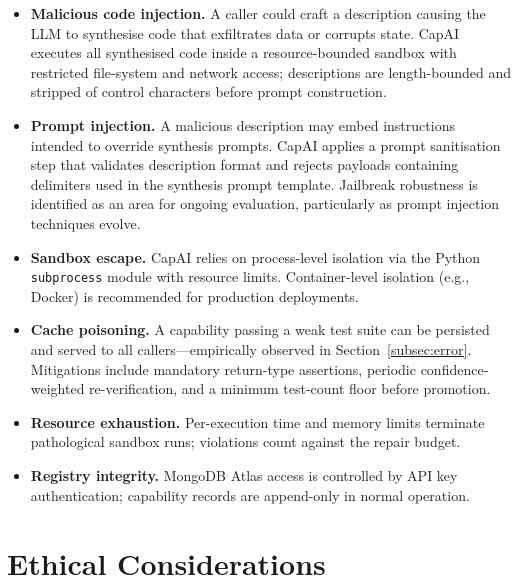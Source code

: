 \documentclass[conference]{IEEEtran}
\begin{document}
\begin{itemize}
  \item \textbf{Malicious code injection.} A caller could craft a description
        causing the LLM to synthesise code that exfiltrates data or corrupts
        state. CapAI executes all synthesised code inside a resource-bounded
        sandbox with restricted file-system and network access; descriptions
        are length-bounded and stripped of control characters before prompt
        construction.

  \item \textbf{Prompt injection.} A malicious description may embed
        instructions intended to override synthesis prompts.
        CapAI applies a prompt sanitisation step that validates description
        format and rejects payloads containing delimiters used in the
        synthesis prompt template.
        Jailbreak robustness is identified as an area for ongoing evaluation,
        particularly as prompt injection techniques evolve.

  \item \textbf{Sandbox escape.} CapAI relies on process-level isolation via
        the Python \texttt{subprocess} module with resource limits.
        Container-level isolation (e.g., Docker) is recommended for
        production deployments.

  \item \textbf{Cache poisoning.} A capability passing a weak test suite can
        be persisted and served to all callers---empirically observed in
        Section~\ref{subsec:error}.
        Mitigations include mandatory return-type assertions, periodic
        confidence-weighted re-verification, and a minimum test-count floor
        before promotion.

  \item \textbf{Resource exhaustion.} Per-execution time and memory limits
        terminate pathological sandbox runs; violations count against the
        repair budget.

  \item \textbf{Registry integrity.} MongoDB Atlas access is controlled by
        API key authentication; capability records are append-only in normal
        operation.
\end{itemize}

\section{Ethical Considerations}
\label{sec:ethics}
\end{document}
